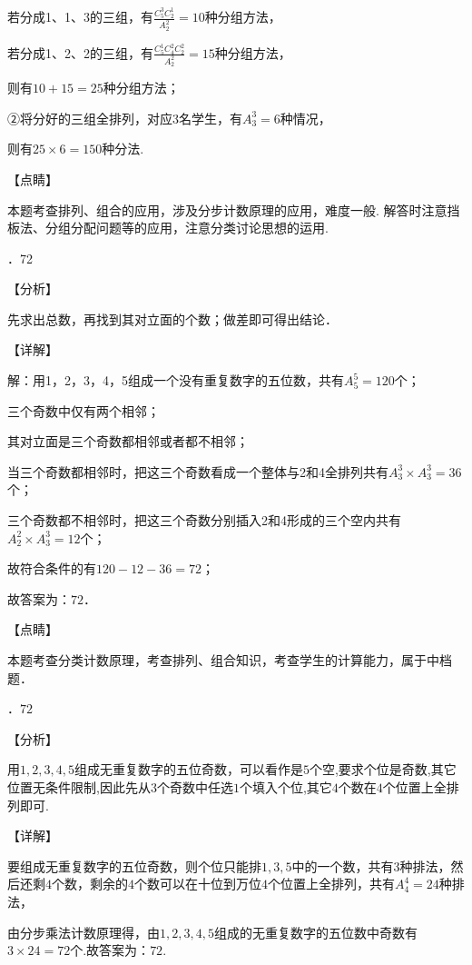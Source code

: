 \documentclass[a4paper,11pt,UTF8,twoside]{ctexart} %
\begin{document}
\noindent 若分成1、1、3的三组，有$\frac{C_{5}^{3} C_{2}^{1} }{A_{2}^{2} } =10$种分组方法，

\noindent 若分成1、2、2的三组，有$\frac{C_{5}^{1} C_{4}^{2} C_{2}^{2} }{A_{2}^{2} } =15$种分组方法，

\noindent 则有$10+15=25$种分组方法；

\noindent ②将分好的三组全排列，对应$3$名学生，有$A_{3}^{3} =6$种情况，

\noindent 则有$25\times 6=150$种分法.

\noindent 【点睛】

\noindent 本题考查排列、组合的应用，涉及分步计数原理的应用，难度一般. 解答时注意挡板法、分组分配问题等的应用，注意分类讨论思想的运用.

．72

\noindent 【分析】

\noindent 先求出总数，再找到其对立面的个数；做差即可得出结论．

\noindent 【详解】

\noindent 解：用1，2，3，4，5组成一个没有重复数字的五位数，共有$A_{5}^{5} =120$个；

\noindent 三个奇数中仅有两个相邻；

\noindent 其对立面是三个奇数都相邻或者都不相邻；

\noindent 当三个奇数都相邻时，把这三个奇数看成一个整体与2和4全排列共有$A_{3}^{3} \times A_{3}^{3} =36$个；

\noindent 三个奇数都不相邻时，把这三个奇数分别插入2和4形成的三个空内共有$A_{2}^{2} \times A_{3}^{3} =12$个；

\noindent 故符合条件的有$120-12-36=72$；

\noindent 故答案为：$72$．

\noindent 【点睛】

\noindent 本题考查分类计数原理，考查排列、组合知识，考查学生的计算能力，属于中档题．

．$72$

\noindent 【分析】

\noindent 用$1,2,3,4,5$组成无重复数字的五位奇数，可以看作是$5$个空,要求个位是奇数,其它位置无条件限制,因此先从$3$个奇数中任选$1$个填入个位,其它$4$个数在$4$个位置上全排列即可.

\noindent 【详解】

\noindent 要组成无重复数字的五位奇数，则个位只能排$1,3,5$中的一个数，共有3种排法，然后还剩$4$个数，剩余的$4$个数可以在十位到万位$4$个位置上全排列，共有$A_{4}^{4} =24$种排法，

\noindent 由分步乘法计数原理得，由$1,2,3,4,5$组成的无重复数字的五位数中奇数有$3\times 24=72$个.故答案为：$72$.
\end{document}
